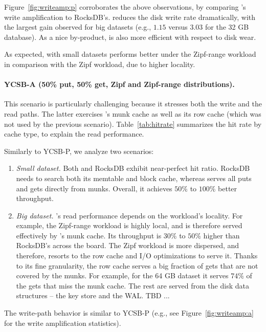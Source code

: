 Figure~\ref{fig:writeamp:p} corroborates the above observations, by comparing 
\sys's write amplification to RocksDB's. \sys\/ reduces the disk write rate dramatically, 
with the largest gain observed for big datasets (e.g., $1.15$ versus $3.03$ for the 32 GB 
database). As a nice by-product, \sys\/ is also more efficient with respect to disk wear.  

As expected, with small datasets \sys\/ performs better under the Zipf-range workload  
in comparison with the Zipf workload, due to higher locality. 

\paragraph{YCSB-A (50\% put, 50\% get, Zipf and Zipf-range distributions).}

This scenario is particularly challenging because it stresses both the write and the read paths. 
The latter exercises \sys's munk cache as well as its row cache (which was not used by the previous 
scenario). Table~\ref{tab:hitrate} summarizes the hit rate by cache type, to explain the read performance. 

Similarly to YCSB-P, we analyze two scenarios: 

\begin{enumerate}
\item {\em Small dataset.} Both \sys\/ and RocksDB exhibit near-perfect hit ratio. RocksDB needs to search 
both its memtable and block cache, whereas \sys\/ serves all puts and gets directly from munks. Overall, it
achieves $50\%$ to $100\%$ better throughput.

\item {\em Big dataset.} \sys's read performance depends on the workload's locality. For example, 
the Zipf-range workload is highly local, and is therefore served effectively by \sys's munk cache. 
Its throughput is $30\%$ to $50\%$ higher than RocksDB's across the board. The Zipf workload
is more dispersed, and therefore, \sys\/ resorts to the row cache and I/O optimizations to serve it.  
Thanks to its fine granularity, the row cache serves a big fraction of gets that are not covered by the munks. 
For example, for the 64 GB dataset it serves $74\%$ of the gets that miss the munk cache. The rest are served 
from the disk data structures -- the key store and the WAL. TBD ... 

\end{enumerate}

The write-path behavior is similar to YCSB-P (e.g., see Figure~\ref{fig:writeamp:a} for the write
amplification statistics). 

